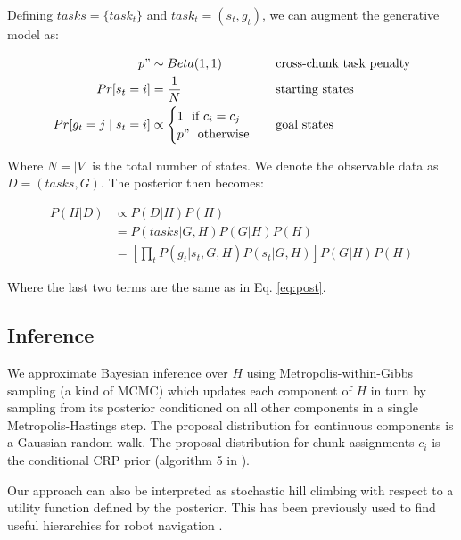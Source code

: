 \documentclass[11pt]{article}
\begin{document}
Defining $tasks = \{task_t\}$ and $task_t = (s_t,g_t)$, we can augment the generative model as:

\begin{align*}
    p" &\sim Beta(1,1)		&& \text{cross-chunk task penalty} \\
    Pr[s_t = i] &= \frac{1}{N}		&& \text{starting states} \\
    Pr[g_t = j \mid s_t = i] &\propto \begin{cases} 1 \,\,\text{ if } c_i = c_j  \\ p" \,\,\text{ otherwise} \end{cases} 		&& \text{goal states} 
\end{align*}

Where $N = |V|$ is the total number of states. We denote the observable data as $D = (tasks, G)$. The posterior then becomes:

\begin{align}
    P(H|D) &\propto P(D|H) P(H) \\ 
    &= P(tasks|G,H) P(G|H) P(H) \\
    &= \left[ \prod_t P(g_t|s_t,G,H) P(s_t|G,H) \right] P(G|H) P(H)
\end{align}

Where the last two terms are the same as in Eq. \ref{eq:post}.

\subsection{Inference}

We approximate Bayesian inference over $H$ using Metropolis-within-Gibbs sampling \cite{roberts2009examples} (a kind of MCMC) which updates each component of $H$ in turn by sampling from its posterior conditioned on all other components in a single Metropolis-Hastings step. The proposal distribution for continuous components is a Gaussian random walk. The proposal distribution for chunk assignments $c_i$ is the conditional CRP prior (algorithm 5 in \cite{neal2000markov}).

Our approach can also be interpreted as stochastic hill climbing with respect to a utility function defined by the posterior. This has been previously used to find useful hierarchies for robot navigation \cite{fernandez2013multi}.
\end{document}

